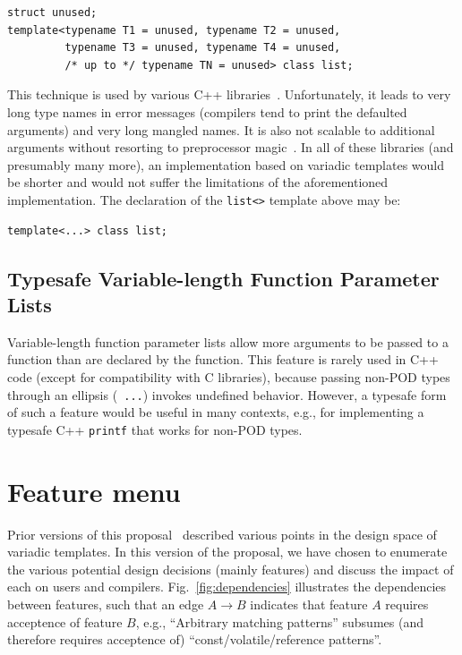 \documentclass{article}
\begin{document}
\begin{verbatim}
struct unused;
template<typename T1 = unused, typename T2 = unused, 
         typename T3 = unused, typename T4 = unused, 
         /* up to */ typename TN = unused> class list;
\end{verbatim}

This technique is used by various C++ libraries~\cite{Tuples01,
Jarvi02, Gurtovoy02}. Unfortunately, it leads to very
long type names in error messages (compilers tend to print the
defaulted arguments) and very long mangled names. It is also not
scalable to additional arguments without resorting to preprocessor
magic~\cite{Preprocessor01}. In all of these libraries (and presumably
many more), an implementation based on variadic templates would be
shorter and would not suffer the limitations of the aforementioned
implementation. The declaration of the {\tt list<>} template above may
be:
\begin{verbatim}
template<...> class list;
\end{verbatim}

\subsection{Typesafe Variable-length Function Parameter Lists}
Variable-length function parameter lists allow more arguments to be
passed to a function than are declared by the function. This feature
is rarely used in C++ code (except for compatibility with C
libraries), because passing non-POD types through an ellipsis ({\tt
  ...}) invokes undefined behavior. However, a typesafe form of such a
feature would be useful in many contexts, e.g., for implementing a
typesafe C++ {\tt printf} that works for non-POD types.

\section{Feature menu}
Prior versions of this proposal~\cite{GJP03,GJP04a} described various
points in the design space of variadic templates. In this version of
the proposal, we have chosen to enumerate the various potential design
decisions (mainly features) and discuss the impact of each on users
and compilers. Fig.~\ref{fig:dependencies} illustrates the
dependencies between features, such that an edge $A \rightarrow B$
indicates that feature $A$ requires acceptence of feature $B$, e.g.,
``Arbitrary matching patterns'' subsumes (and therefore requires
acceptence of) ``const/volatile/reference patterns''. 
\end{document}
